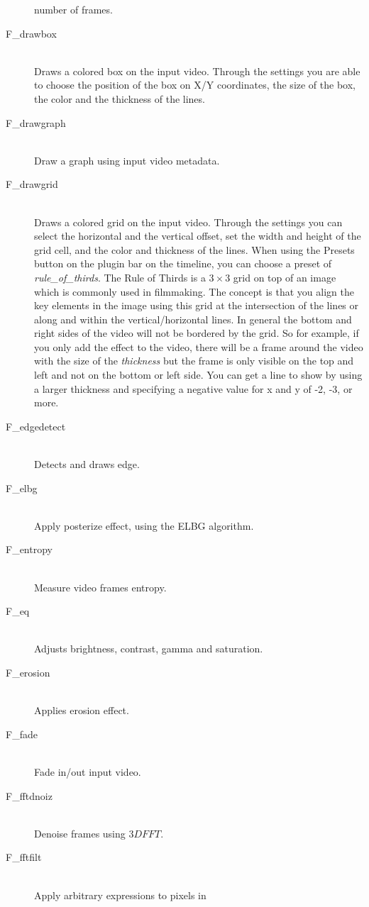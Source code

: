 \begin{description}
  number of frames.
\item [F\_drawbox]~\\Draws a colored box on the input
  video. Through the settings you are able to choose the position of
  the box on X/Y coordinates, the size of the box, the color and the
  thickness of the lines.
\item [F\_drawgraph]~\\Draw a graph using input video
  metadata.
\item [F\_drawgrid]~\\Draws a colored grid on the input
  video. Through the settings you can select the horizontal and the
  vertical offset, set the width and height of the grid cell, and the
  color and thickness of the lines. When using the Presets button on
  the plugin bar on the timeline, you can choose a preset of
  \textit{rule\_of\_thirds}. The Rule of Thirds is a $3\times3$ grid
  on top of an image which is commonly used in filmmaking. The concept
  is that you align the key elements in the image using this grid at
  the intersection of the lines or along and within the
  vertical/horizontal lines.  In general the bottom and right sides of
  the video will not be bordered by the grid.  So for example, if you
  only add the effect to the video, there will be a frame around the
  video with the size of the \textit{thickness}
  but the frame is only visible on the top and left and not on the bottom
  or left side.  You can get a line to show by using a larger thickness
  and specifying a negative value for x and y of -2, -3, or more. 
\item [F\_edgedetect]~\\Detects and draws edge.
\item [F\_elbg]~\\Apply posterize effect, using the ELBG
  algorithm.
\item [F\_entropy]~\\Measure video frames entropy.
\item [F\_eq]~\\Adjusts brightness, contrast, gamma and
  saturation.
\item [F\_erosion]~\\Applies erosion effect.
\item [F\_fade]~\\Fade in/out input video.
\item [F\_fftdnoiz]~\\Denoise frames using $3D FFT$.
\item [F\_fftfilt]~\\Apply arbitrary expressions to pixels in

\end{description}
